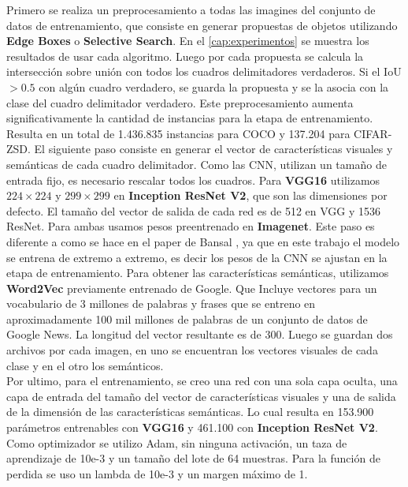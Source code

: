 Primero se realiza un preprocesamiento a todas las imagines del conjunto de datos de entrenamiento, que consiste en generar propuestas de objetos utilizando \textbf{Edge Boxes} o \textbf{Selective Search}. En el \autoref{cap:experimentos} se muestra los resultados de usar cada algoritmo. Luego por cada propuesta se calcula la intersección sobre unión con todos los cuadros delimitadores verdaderos. Si el IoU $> 0.5$ con algún cuadro verdadero, se guarda la propuesta y se la asocia con la clase del cuadro delimitador verdadero. Este preprocesamiento aumenta significativamente la cantidad de instancias para la etapa de entrenamiento. Resulta en un total de 1.436.835 instancias para COCO y 137.204 para CIFAR-ZSD. El siguiente paso consiste en generar el vector de características visuales y semánticas de cada cuadro delimitador. Como las CNN, utilizan un tamaño de entrada fijo, es necesario rescalar todos los cuadros.  Para \textbf{VGG16} utilizamos $224 \times 224$  y $299 \times 299$ en \textbf{Inception ResNet V2}, que son las dimensiones por defecto. El tamaño del vector de salida de cada red es de 512 en VGG y 1536 ResNet. Para ambas usamos pesos preentrenado en \textbf{Imagenet}. Este paso es diferente a como se hace en el paper de Bansal \cite{bansal2018zero}, ya que en este trabajo el modelo se entrena de extremo a extremo, es decir los pesos de la CNN se ajustan en la etapa de entrenamiento. Para obtener las características semánticas, utilizamos \textbf{Word2Vec} previamente entrenado de Google. Que Incluye vectores para un vocabulario de 3 millones de palabras y frases que se entreno en aproximadamente 100 mil millones de palabras de un conjunto de datos de Google News. La longitud del vector resultante es de 300. Luego se guardan dos archivos por cada imagen, en uno se encuentran los vectores visuales de cada clase y en el otro los semánticos.\\

Por ultimo, para el entrenamiento, se creo una red con una sola capa oculta, una capa de entrada del tamaño del vector de características visuales y una de salida de la dimensión de las características semánticas. Lo cual resulta en 153.900 parámetros entrenables con \textbf{VGG16} y 461.100 con \textbf{Inception ResNet V2}. Como optimizador se utilizo Adam, sin ninguna activación, un taza de aprendizaje de 10e-3 y un tamaño del lote de 64 muestras. Para la función de perdida se uso un lambda de 10e-3 y un margen máximo de 1.\\



